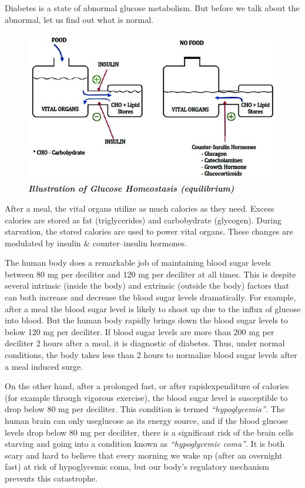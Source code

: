 Diabetes is a state of abnormal glucose metabolism. But before we talk about the abnormal, let us find out what is normal.

\vskip 10pt

\begin{figure}[h]
\centering
\includegraphics[scale=2.5]{images/017.jpg}\\
\textit{\textbf{Illustration of Glucose Homeostasis (equilibrium)}}
\end{figure}

After a meal, the vital organs utilize as much calories as they need. Excess calories are stored as fat (triglycerides) and carbobydrate (glycogen). During starvation, the stored calories are used to power vital organs. These changes are modulated by insulin \& counter–insulin hormones.

The human body does a remarkable job of maintaining blood sugar levels between 80 mg per deciliter and 120 mg per deciliter at all times.
 This is despite several intrinsic (inside the body) and extrinsic (outside the body) factors that can both increase and decrease the blood sugar levels dramatically. For example, after a meal the blood sugar level is likely to shoot up due to the influx of glucose into blood. But the human body rapidly brings down the blood sugar levels to below 120 mg per deciliter. If blood sugar levels are more than 200 mg per deciliter 2 hours after a meal, it is diagnostic of diabetes. Thus, under normal conditions, the body takes less than 2 hours to normalize blood sugar levels after a meal induced surge.

\vskip 6pt
On the other hand, after a prolonged fast, or after rapid\break expenditure of calories (for example through vigorous exercise), the blood sugar level is susceptible to drop below 80 mg per deciliter. This condi\-tion is termed \textit{“hypoglycemia”}. The human brain can only use\break glucose as its energy source, and if the blood glucose levels drop below 80 mg per deciliter, there is a significant risk of the brain cells star\-ving and going into a condition known as \textit{“hypoglycemic coma”}. It is both scary and hard to believe that every morning we wake up (after an overnight fast) at risk of hypoglycemic coma, but our body’s regulatory mechanism prevents this catastrophe.

